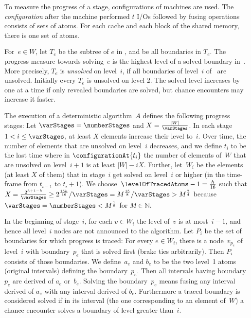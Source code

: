 \documentclass[envcountsame]{llncs}
\begin{document}
To measure the progress of a stage, configurations of \fusePEM machines are used.
The \emph{configuration}  after the \fusePEM machine performed $t$ I/Os followed by fusing operations consists of sets of atoms.
For each cache and each block of the shared memory, there is one set of atoms.



For~$e\in W$, let $T_e$ be the subtree of $e$ in \binaryTreeOf{\gifInstance}, and  be all boundaries in $T_e$. The progress measure towards solving~$e$ is the highest level of a solved boundary in~.
More precisely, $T_e$ is \emph{unsolved} on level~$i$, if all boundaries of level~$i$ of~ are unsolved. 
Initially every $T_e$ is unsolved on level $2$. The solved level increases by one at a time if only revealed boundaries are solved, but chance encounters may increase it faster.





The execution of a deterministic algorithm~$A$ defines the following \varStages progress stages:
Let $\varStages=\numberStages$ and $X=\frac{|W|}{\varStages}$.
In each stage~$1 < i \leq \varStages$, at least $X$ elements increase their level to~$i$.
Over time, the number of elements that are unsolved on level~$i$ decreases, and we define $t_i$ to be the last time where in $\configurationAt{t_i}$ the number of elements of~$W$ that are unsolved on level~$i+1$ is at least $|W|-iX$.
Further, let~$W_i$ be the elements (at least $X$ of them) that in stage~$i$ get solved on level~$i$ or higher (in the time-frame from $t_{i-1}$ to $t_i+1$).
We choose~$\levelOfTracedAtoms-1 = \frac{h}{16}$ such that $X = \frac{2^{h+1-k}}{\varStages}\geq 2^\frac{15h}{16}/\varStages = M^\frac{15}{8}/\varStages > M^\frac{7}{4}$ because $\varStages = \numberStages < M^\frac{1}{8}$ for $M\in\mathbb{N}$.



In the beginning of stage~$i$, for each $v \in W_i$ the level of~$v$ is at most~$i-1$, and hence all level~$i$ nodes are not announced to the algorithm. 
Let $P_i$ be the set of boundaries for which progress is traced:
For every $e\in W_i$, there is a node~$v_{p_e}$ of level~$i$ with boundary~$p_e$ that is solved first (brake ties arbitrarily). 
Then $P_i$ consists of those boundaries.
We define~$a_e$ and $b_e$ to be the two level~1 atoms (original intervals) defining the boundary~$p_e$.
Then all intervals having boundary~$p_e$ are derived of $a_e$ or~$b_e$.
Solving the boundary~$p_e$ means fusing any interval derived of $a_e$ with any interval derived of $b_e$. 
Furthermore a traced boundary is considered solved if in its interval (the one corresponding to an element of~$W$) a chance encounter solves a boundary of level greater than~$i$.
\end{document}
